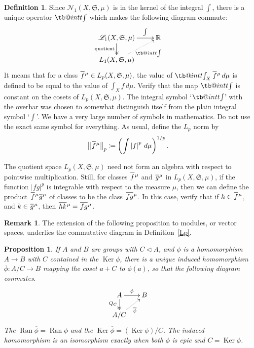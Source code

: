 \documentclass[
twoside=true,
paper=letter,
fontsize=9pt,
pagesize=auto,
leqno,
openany,
headsepline,
overfullrule,
]{scrbook}
\makeatletter
\theoremstyle{plain}
\theoremstyle{plain}
\newtheorem{prop}[thm]{Proposition}
\theoremstyle{definition}
\newtheorem{defn}[thm]{Definition}
\newtheorem{rmk}[thm]{Remark}
\theoremstyle{bfnoteitalic}
\theoremstyle{bfnoteroman}
\newcommand{\sigalg}[1]{\mathfrak{#1}}
\newcommand{\cali}[1]{\mathscr{#1}}
\newcommand{\normalin}{\vartriangleleft}
\DeclareMathOperator{\range}{Ran}
\DeclareMathOperator{\kernel}{Ker}
\newcommand{\definedby}{\coloneqq}
\newcommand{\abs}[1]{\left\vert#1\right\vert}
\newcommand{\R}{\mathbb{R}}
\newcommand{\semiring}{\sigalg{S}}
\newcommand{\measurespace}{X}
\newcommand{\measure}{\mu}
\newcommand*\xbar[1]{%
   \hbox{%
     \vbox{%
       \hrule height 0.4pt %
       \kern0.4ex%
       \hbox{%
         \ensuremath{#1}%
       }%
     }%
   }%
}
\newcommand\tint{\mathop{\mathpalette\tb@int{t}}\!\int}
\newcommand\tb@int[2]{%
  \sbox\z@{$\m@th#1\int$}%
  \if#2t%
    \rlap{\hbox to\wd\z@{%
      \hfil
      \vrule width .35em height \dimexpr\ht\z@+1.4pt\relax depth -\dimexpr\ht\z@+1pt\relax
      \kern.05em %
    }}
  \else
    \rlap{\hbox to\wd\z@{%
      \vrule width .35em height -\dimexpr\dp\z@+1pt\relax depth \dimexpr\dp\z@+1.4pt\relax
      \hfil
    }}
  \fi
}
\newcommand{\lebclass}[1]{\hspace{.5pt}\xbar{#1}\hspace{0.5pt}}
\newcommand{\ellclass}[2]{\lebclass{#1}^{#2}}
\newcommand{\inducedint}{\tint}
\makeatother
\begin{document}
\begin{defn}
Since $\cali{N}_1(\measurespace, \semiring, \measure)$ is in the kernel of the integral $\int$, there is a unique operator $\inducedint$ which makes the following diagram commute:
\[
\xymatrix@R=16pt{ 
\cali{L}_1(\measurespace, \semiring, \measure) \ar[r]^-{\int} 
\ar@{->>}[d]_{\text{quotient}}
&
\R  
\\
L_1(\measurespace, \semiring, \measure)
 \ar@{.>}[ur]_-{\inducedint}
\\
}
\]
It means that for a class 
$\ellclass{f}{\measure}\in L_p(\measurespace, \semiring, \measure)$, the value of 
$\inducedint_\measurespace \ellclass{f}{\measure}\, d\measure$ is defined to be equal to the value of
$\int_\measurespace f\, d\measure$. Verify that the map $\inducedint$ is constant on the cosets of 
$L_p(\measurespace, \semiring, \measure)$.
The integral symbol `$\inducedint$' with the overbar was chosen to somewhat distinguish itself from the plain integral symbol `$\int$'.  We have a very large number of symbols in mathematics. Do not use the exact same symbol for everything. As usual, define the $L_p$ norm by 
\[
\bigl\Vert\ellclass{f}{\measure}\bigr\Vert_p
\definedby
\left(\int\abs{f}^p\,d\measure\right)^{1/p}.
\]

The quotient space $L_p(\measurespace, \semiring, \measure)$ need not form an algebra with respect to pointwise multiplication. Still, for classes $\ellclass{f}{\measure}$ and $\ellclass{g}{\measure}$ in $L_p(\measurespace, \semiring, \measure)$, if the function $\abs{fg}^p$ is integrable with respect to the measure $\measure$, then we can define the product
$\ellclass{f}{\measure}\ellclass{g}{\measure}$ of classes to be the class $\ellclass{fg}{\measure}$. In this case, verify that if $h\in\ellclass{f}{\measure}$, and $k\in\ellclass{g}{\measure}$, then $\ellclass{hk}{\measure} = \ellclass{fg}{\measure}$.

\end{defn}



\begin{rmk}
The extension of the following proposition to modules, or vector spaces, underlies the commutative diagram in Definition~\ref{Lp}. 
\end{rmk}

\begin{prop}\label{induced_homomorphism}
If $A$ and $B$ are groups with $C \normalin A$, and $\phi$ is a homomorphism ${A\to B}$ with $C$ contained in the $\kernel \phi$, there is a unique induced homomorphism ${\overline \phi}:A/C\to B$ mapping the coset $a+C$ to $\phi(a)$, so that the following diagram commutes.
\[
\xymatrix@R=14pt@C=16pt{
 A  \ar[r]^{\phi} \ar@{->>}[d]_<<<{Q_C} &  B \\
 A/C \ar@{.>}[ur]_{\overline \phi} &                     \\}
\]
The $\range {\overline \phi} = \range \phi$ and the $\kernel {\overline \phi} =(\kernel \phi) /C$. The induced homomorphism is an isomorphism exactly when both $\phi$ is epic and $C=\kernel \phi$.

\end{prop}
\end{document}
